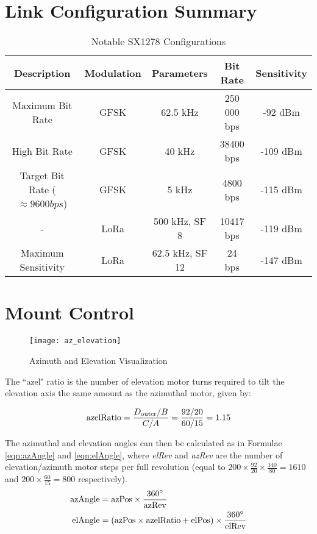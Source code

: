 \section{Link Configuration Summary}
\begin{table}[!htb]
    \centering
    \renewcommand{\arraystretch}{1.2}
    \begin{tabular}{ |c|c|c|c|c| }
    \hline
    \textbf{Description} & \textbf{Modulation} & \textbf{Parameters} & \textbf{Bit Rate} & \textbf{Sensitivity} \\
    \hline
    Maximum Bit Rate &
    GFSK &
    62.5 kHz &
    250 000 bps &
    -92 dBm \\
    \hline
    High Bit Rate &
    GFSK &
    40 kHz &
    38400 bps &
    -109 dBm \\
    \hline
    Target Bit Rate ($\approx 9600 bps$) &
    GFSK &
    5 kHz &
    4800 bps &
    -115 dBm \\
    \hline
    - &
    LoRa &
    500 kHz, SF 8 &
    10417 bps &
    -119 dBm \\
    \hline
    Maximum Sensitivity &
    LoRa &
    62.5 kHz, SF 12 &
    24 bps &
    -147 dBm \\
    \hline
    \end{tabular}
    \caption{Notable SX1278 Configurations \cite{datasheet-SX1278}}
    \label{tab:sensitivity_values}
  \end{table}


\clearpage
\section{Mount Control}\label{sec:appendix_mount_control}
\begin{figure}[!htb]
    \centering
    \texttt{[image: az\_elevation]}
    \caption{Azimuth and Elevation Visualization \cite{site-azElevationVisual}}
    \label{fig:az_elevation}
\end{figure}
The ``azel" ratio is the number of elevation motor turns required to tilt the elevation axis the same amount as the azimuthal motor, given by:

\begin{equation}\label{eqn:azelRatio}
\textnormal{azelRatio} = \frac{D_{\textnormal{outer}} / B}{C / A} = \frac{92 / 20}{60 / 15} = 1.15
\end{equation}

\noindent The azimuthal and elevation angles can then be calculated as in Formulae \ref{eqn:azAngle} and \ref{eqn:elAngle}, where \textit{elRev} and \textit{azRev} are the number of elevation/azimuth motor steps per full revolution (equal to $200 \times \frac{92}{20} \times \frac{140}{80} = 1610$ and $200 \times \frac{60}{15} = 800$ respectively).
\begin{align}
    \textnormal{azAngle} &= \textnormal{azPos} \times \frac{360 ^{\circ}}{\textnormal{azRev}} \label{eqn:azAngle} \\
    \textnormal{elAngle} &= (\textnormal{azPos} \times \textnormal{azelRatio} + \textnormal{elPos}) \times \frac{360 ^{\circ}}{\textnormal{elRev}} \label{eqn:elAngle}
\end{align}

